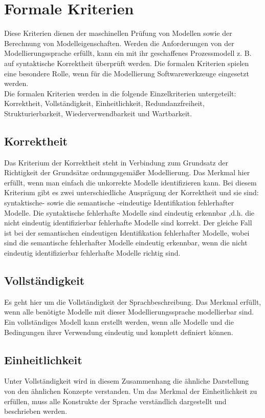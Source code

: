 \section{Formale Kriterien}  

Diese Kriterien dienen der maschinellen Prüfung von Modellen sowie der Berechnung von Modelleigenschaften. Werden die Anforderungen von der Modellierungssprache erfüllt, kann ein mit ihr geschaffenes Prozessmodell z. B. auf syntaktische Korrektheit überprüft werden. Die formalen Kriterien spielen eine besondere Rolle, wenn für die Modellierung Softwarewerkzeuge eingesetzt werden\cite{MT007}.\\
Die formalen Kriterien werden in die folgende Einzelkriterien untergeteilt:  Korrektheit, Vollständigkeit, Einheitlichkeit, Redundanzfreiheit, Strukturierbarkeit, Wiederverwendbarkeit und Wartbarkeit.
\subsection{Korrektheit}
Das Kriterium der Korrektheit steht in Verbindung zum Grundsatz der Richtigkeit der Grundsätze ordnungsgemäßer Modellierung.
Das Merkmal hier erfüllt, wenn man einfach die unkorrekte Modelle identifizieren kann.
Bei diesem Kriterium gibt es zwei unterschiedliche Ausprägung der Korrektheit und sie sind: syntaktische- sowie die semantische -eindeutige Identifikation fehlerhafter Modelle. 
Die syntaktische fehlerhafte Modelle sind eindeutig erkennbar ,d.h. die nicht eindeutig identifizierbar fehlerhafte Modelle sind korrekt. Der gleiche Fall ist bei der semantischen eindeutigen Identifikation fehlerhafter Modelle, wobei sind die semantische fehlerhafter Modelle eindeutig erkennbar, wenn die nicht eindeutig identifizierbar fehlerhafte Modelle richtig sind.
\subsection{Vollständigkeit}
Es geht hier um die Vollständigkeit der Sprachbeschreibung. Das Merkmal erfüllt, wenn alle benötigte Modelle mit dieser Modellierungssprache modellierbar sind.
Ein vollständiges Modell kann erstellt werden, wenn alle Modelle und die Bedingungen ihrer Verwendung eindeutig und komplett definiert können.
\subsection{Einheitlichkeit}
Unter Vollständigkeit wird in diesem Zusammenhang die ähnliche Darstellung von den ähnlichen Konzepte verstanden.
Um das Merkmal der Einheitlichkeit zu erfüllen, muss alle Konstrukte der Sprache verständlich dargestellt und beschrieben werden.
